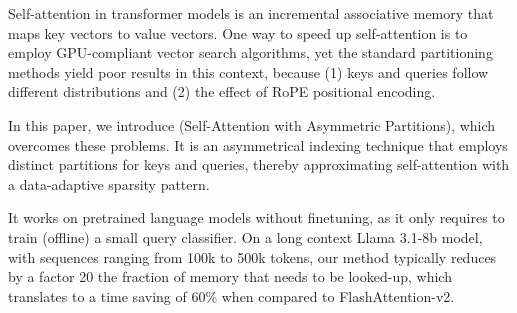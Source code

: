 
Self-attention in transformer models is an incremental associative memory that maps key vectors to value vectors.
One way to speed up self-attention is to employ GPU-compliant vector search algorithms, yet the standard partitioning methods yield poor results in this context, because (1) keys and queries follow different distributions and (2) the effect of RoPE positional encoding. 

In this paper, we introduce \OURS{} (Self-Attention with Asymmetric Partitions), which overcomes these problems. It is an asymmetrical indexing technique that employs distinct partitions for keys and queries, thereby approximating self-attention with a data-adaptive sparsity pattern. 

It works on pretrained language models without finetuning, as it only requires to train (offline) a small query classifier. 
On a long context Llama 3.1-8b model, with sequences ranging from 100k to 500k tokens, our method typically reduces by a factor 20 the fraction of memory that needs to be looked-up, which translates to a time saving of 60\% when compared to  FlashAttention-v2. 


%

%
%
%
%


%
%
%
%
%
%
%
%

